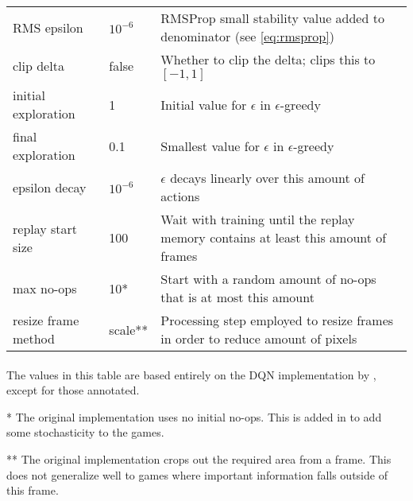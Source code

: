 \begin{table}[]
\begin{tabularx}{1.1\linewidth}{ll X}
RMS epsilon                     & $10^{-6}$         & RMSProp small stability value added to denominator (see \ref{eq:rmsprop})                              \\
clip delta                      & false             & Whether to clip the delta; \cite{Mnih2015} clips this to $[-1, 1]$                                      \\
initial exploration             & 1                 & Initial value for $\epsilon$ in $\epsilon$-greedy                                                        \\
final exploration               & 0.1               & Smallest value for $\epsilon$ in $\epsilon$-greedy                                                       \\
epsilon decay                   & $10^{-6}$         & $\epsilon$ decays linearly over this amount of actions                                                   \\
replay start size               & 100               & Wait with training until the replay memory contains at least this amount of frames                       \\
max no-ops                      & 10*              & Start with a random amount of no-ops that is at most this amount                                         \\
resize frame method             & scale**          & Processing step employed to resize frames in order to reduce amount of pixels                            \\
\end{tabularx}
\paragraph{}
  The values in this table are based entirely on the DQN implementation by
  \cite{Mnih2013},
  except for those annotated.

  * The original implementation uses no initial no-ops.
  This is added in to add some stochasticity to the games.

  ** The original implementation crops out the required area from a frame.
  This does not generalize well to games where important information
  falls outside of this frame.
\end{table}

